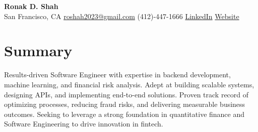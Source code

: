 \documentclass[letterpaper,10pt]{article}
\begin{document}
\begin{center}
    \textbf{\Huge Ronak D. Shah}\\
    San Francisco, CA \hspace{1em} \href{mailto:roshah2023@gmail.com}{roshah2023@gmail.com} \hspace{1em} (412)-447-1666 \hspace{1em} \href{http://www.linkedin.com/in/ronakshah52}{LinkedIn} \hspace{1em} \href{https://ronakdshah.github.io/}{Website}
\end{center}
\section*{Summary}
Results-driven Software Engineer with expertise in backend development, machine learning, and financial risk analysis. Adept at building scalable systems, designing APIs, and implementing end-to-end solutions. Proven track record of optimizing processes, reducing fraud risks, and delivering measurable business outcomes. Seeking to leverage a strong foundation in quantitative finance and Software Engineering to drive innovation in fintech.
\end{document}
